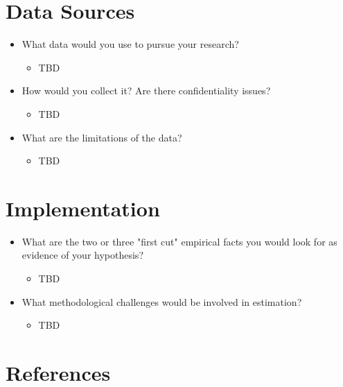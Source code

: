 \documentclass[12pt,oneside]{article}
\theoremstyle{definition}
\theoremstyle{remark}
\begin{document}
\section{Data Sources}
\begin{itemize}
    \item What data would you use to pursue your research?
    \begin{itemize}
        \item TBD
    \end{itemize}
    \item How would you collect it? Are there confidentiality issues?
    \begin{itemize}
        \item TBD
    \end{itemize}
    \item What are the limitations of the data?
    \begin{itemize}
        \item TBD
    \end{itemize}
\end{itemize}

\section{Implementation}
\begin{itemize}
    \item What are the two or three "first cut" empirical facts you would look for as evidence of your hypothesis?
    \begin{itemize}
        \item TBD
    \end{itemize}
    \item What methodological challenges would be involved in estimation?
    \begin{itemize}
        \item TBD
    \end{itemize}
\end{itemize}

\section{References}

\end{document}
